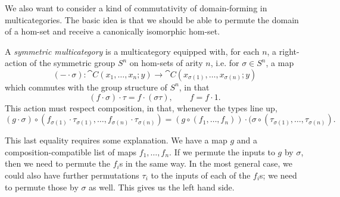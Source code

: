 We also want to consider a kind of commutativity of domain-forming in
multicategories. The basic idea is that we should be able to permute the domain
of a hom-set and receive a canonically isomorphic hom-set. 

\begin{dfn}
  A \emph{symmetric multicategory} is a multicategory equipped with, for each
  $n$, a right-action of the symmetric group $S^n$ on hom-sets of arity $n$,
  i.e. for $\sigma\in S^n$, a map  \[
    (-\cdot \sigma): \cat{C}(x_1,\dots,x_n; y)\to\cat{C}(x_{\sigma(1)},\dots,x_{\sigma(n)}; y)
  \] which commutes with the group structure of $S^n$, in that \[
    (f\cdot \sigma)\cdot \tau = f\cdot(\sigma\tau),\quad\quad f = f\cdot 1.
  \] This action must respect composition, in that, whenever the types line up, \[
    (g\cdot \sigma)\circ(f_{\sigma(1)}\cdot\tau_{\sigma(1)},\dots,f_{\sigma(n)}\cdot\tau_{\sigma(n)}) =
    (g\circ(f_1,\dots,f_n))\cdot(\sigma\circ(\tau_{\sigma(1)},\dots,\tau_{\sigma(n)}).
  \]
\end{dfn}

This last equality requires some explanation. We have a map $g$ and a
composition-compatible list of maps $f_1,\dots,f_n$. If we permute the inputs to
$g$ by $\sigma$, then we need to permute the $f_i$s in the same way. In the most general
case, we could also have further permutations $\tau_i$ to the inputs of each of the
$f_i$s; we need to permute those by $\sigma$ as well. This gives us the left
hand side.

